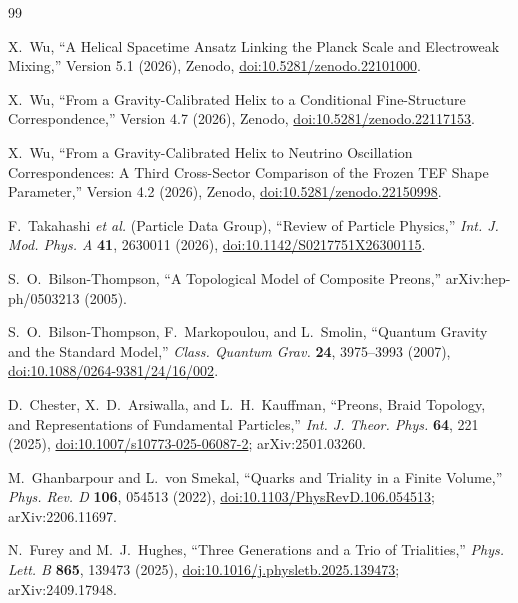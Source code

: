 \documentclass[aps,prd,reprint,superscriptaddress,nofootinbib,longbibliography,floatfix]{revtex4-2}
\begin{document}
\begin{thebibliography}{99}

X.~Wu,
``A Helical Spacetime Ansatz Linking the Planck Scale and Electroweak Mixing,''
Version 5.1 (2026), Zenodo,
\href{https://doi.org/10.5281/zenodo.22101000}{doi:10.5281/zenodo.22101000}.

X.~Wu,
``From a Gravity-Calibrated Helix to a Conditional Fine-Structure Correspondence,''
Version 4.7 (2026), Zenodo,
\href{https://doi.org/10.5281/zenodo.22117153}{doi:10.5281/zenodo.22117153}.

X.~Wu,
``From a Gravity-Calibrated Helix to Neutrino Oscillation Correspondences: A Third Cross-Sector Comparison of the Frozen TEF Shape Parameter,''
Version 4.2 (2026), Zenodo,
\href{https://doi.org/10.5281/zenodo.22150998}{doi:10.5281/zenodo.22150998}.

F.~Takahashi \textit{et al.} (Particle Data Group),
``Review of Particle Physics,''
\textit{Int. J. Mod. Phys. A} \textbf{41}, 2630011 (2026),
\href{https://doi.org/10.1142/S0217751X26300115}{doi:10.1142/S0217751X26300115}.

S.~O.~Bilson-Thompson,
``A Topological Model of Composite Preons,''
arXiv:hep-ph/0503213 (2005).

S.~O.~Bilson-Thompson, F.~Markopoulou, and L.~Smolin,
``Quantum Gravity and the Standard Model,''
\textit{Class. Quantum Grav.} \textbf{24}, 3975--3993 (2007),
\href{https://doi.org/10.1088/0264-9381/24/16/002}{doi:10.1088/0264-9381/24/16/002}.

D.~Chester, X.~D.~Arsiwalla, and L.~H.~Kauffman,
``Preons, Braid Topology, and Representations of Fundamental Particles,''
\textit{Int. J. Theor. Phys.} \textbf{64}, 221 (2025),
\href{https://doi.org/10.1007/s10773-025-06087-2}{doi:10.1007/s10773-025-06087-2};
arXiv:2501.03260.

M.~Ghanbarpour and L.~von Smekal,
``Quarks and Triality in a Finite Volume,''
\textit{Phys. Rev. D} \textbf{106}, 054513 (2022),
\href{https://doi.org/10.1103/PhysRevD.106.054513}{doi:10.1103/PhysRevD.106.054513};
arXiv:2206.11697.

N.~Furey and M.~J.~Hughes,
``Three Generations and a Trio of Trialities,''
\textit{Phys. Lett. B} \textbf{865}, 139473 (2025),
\href{https://doi.org/10.1016/j.physletb.2025.139473}{doi:10.1016/j.physletb.2025.139473};
arXiv:2409.17948.


\end{thebibliography}
\end{document}
